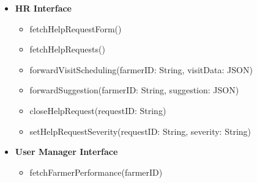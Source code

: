\documentclass[10pt]{article} %
\begin{document}
\begin{itemize}
    \item \textbf{HR Interface}
    \begin{itemize}
        \item fetchHelpRequestForm()
        \item fetchHelpRequests()
        \item forwardVisitScheduling(farmerID: String, visitData: JSON)
        \item forwardSuggestion(farmerID: String, suggestion: JSON)
        \item closeHelpRequest(requestID: String)
        \item setHelpRequestSeverity(requestID: String, severity: String)
    \end{itemize}

    \item \textbf{User Manager Interface}
    \begin{itemize}
        \item fetchFarmerPerformance(farmerID)
    \end{itemize}


\end{itemize}
\end{document}
